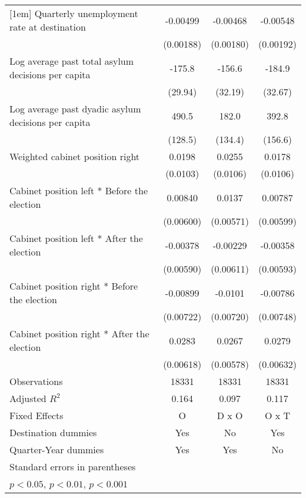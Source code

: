 \begin{table}[htbp]
\begin{tabular}{l*{3}{c}}
[1em]
Quarterly unemployment rate at destination&    -0.00499\sym{*}  &    -0.00468\sym{*}  &    -0.00548\sym{**} \\
                    &   (0.00188)         &   (0.00180)         &   (0.00192)         \\
[1em]
Log average past total asylum decisions per capita&      -175.8\sym{***}&      -156.6\sym{***}&      -184.9\sym{***}\\
                    &     (29.94)         &     (32.19)         &     (32.67)         \\
[1em]
Log average past dyadic asylum decisions per capita&       490.5\sym{***}&       182.0         &       392.8\sym{*}  \\
                    &     (128.5)         &     (134.4)         &     (156.6)         \\
[1em]
Weighted cabinet position right&      0.0198         &      0.0255\sym{*}  &      0.0178         \\
                    &    (0.0103)         &    (0.0106)         &    (0.0106)         \\
[1em]
Cabinet position left * Before the election&     0.00840         &      0.0137\sym{*}  &     0.00787         \\
                    &   (0.00600)         &   (0.00571)         &   (0.00599)         \\
[1em]
Cabinet position left * After the election&    -0.00378         &    -0.00229         &    -0.00358         \\
                    &   (0.00590)         &   (0.00611)         &   (0.00593)         \\
[1em]
Cabinet position right * Before the election&    -0.00899         &     -0.0101         &    -0.00786         \\
                    &   (0.00722)         &   (0.00720)         &   (0.00748)         \\
[1em]
Cabinet position right * After the election&      0.0283\sym{***}&      0.0267\sym{***}&      0.0279\sym{***}\\
                    &   (0.00618)         &   (0.00578)         &   (0.00632)         \\
\hline
Observations        &       18331         &       18331         &       18331         \\
Adjusted \(R^{2}\)  &       0.164         &       0.097         &       0.117         \\
Fixed Effects       &           O         &       D x O         &       O x T         \\
Destination dummies &         Yes         &          No         &         Yes         \\
Quarter-Year dummies&         Yes         &         Yes         &          No         \\
\hline\hline
\multicolumn{4}{l}{\footnotesize Standard errors in parentheses}\\
\multicolumn{4}{l}{\footnotesize \sym{*} \(p<0.05\), \sym{**} \(p<0.01\), \sym{***} \(p<0.001\)}\\
\end{tabular}
\end{table}
